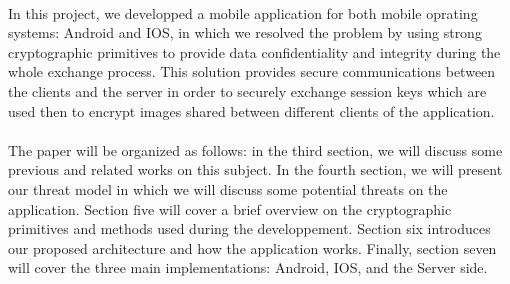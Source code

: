     \paragraph{}
    In this project, we developped a mobile application for both mobile oprating systems: Android and IOS, in which we resolved the problem by using strong cryptographic primitives to provide data confidentiality and integrity during the whole exchange process. This solution provides secure communications between the clients and the server in order to securely exchange session keys which are used then to encrypt images shared between different clients of the application.
    \paragraph{}
    The paper will be organized as follows: in the third section, we will discuss some previous and related works on this subject. In the fourth section, we will present our threat model in which we will discuss some potential threats on the application. Section five will cover a brief overview on the cryptographic primitives and methods used during the developpement. Section six introduces our proposed architecture and how the application works. Finally, section seven will cover the three main implementations: Android, IOS, and the Server side.  